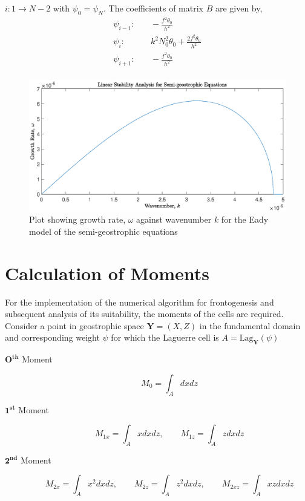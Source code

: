 $i: 1 \rightarrow N-2$ with $\psi_0 = \psi_{N}$. The coefficients of matrix $B$ are given by,
\begin{equation*}
\begin{aligned}
\psi_{i-1}:& \quad -\frac{f^2\theta_0}{h^2}\\
\psi_i:& \quad k^2N_0^2\theta_0 + \frac{2f^2\theta_0}{h^2}\\
\psi_{i+1}:& \quad -\frac{f^2\theta_0}{h^2}\\
\end{aligned}
\end{equation*}
\begin{figure}[h]
	\centering
	\includegraphics[width=\linewidth]{project/Linear_stability_analysis}
	\caption[Linear stability analysis results for the semi-geostrophic equations]{Plot showing growth rate, $\omega$ against wavenumber $k$ for the Eady model of the semi-geostrophic equations}
	\label{fig:linearstabilityanalysis}
\end{figure}
\section{Calculation of Moments}
For the implementation of the numerical algorithm for frontogenesis and subsequent analysis of its suitability, the moments of  the cells are required. Consider a point in geostrophic space $\bm{Y} = \left(X,Z\right)$ in the fundamental domain and corresponding weight $\psi$ for which the Laguerre cell is $A = \mathrm{Lag}_{\bm{Y}}(\psi)$
\begin{description}
	\item [$\bm{O^{th}}$ Moment] 
	\begin{equation}
		M_0 = \int_A dxdz
	\end{equation}
	\item[$\bm{1^{st}}$ Moment]
	\begin{equation}
	M_{1x} = \int_A x dxdz, \qquad M_{1z} = \int_A z dxdz
	\end{equation}
	\item[$\bm{2^{nd}}$ Moment]
	\begin{equation}
	M_{2x} = \int_A x^2 dxdz, \qquad M_{2z} = \int_A z^2 dxdz, \qquad M_{2xz} = \int_A xz dxdz
	\end{equation}	
\end{description}

